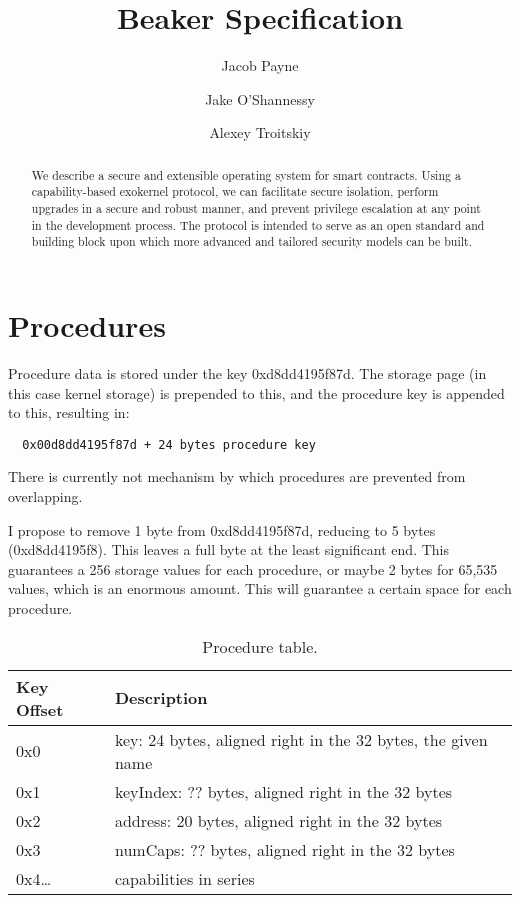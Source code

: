 \documentclass[english,a4paper]{article}
\title{Beaker Specification}\label{beaker-specification}
\author{Jacob Payne \and Jake O'Shannessy \and Alexey Troitskiy}
\begin{document}
\maketitle

\begin{abstract}\label{abstract}

We describe a secure and extensible operating system for smart contracts. Using
a capability-based exokernel protocol, we can facilitate secure isolation,
perform upgrades in a secure and robust manner, and prevent privilege escalation
at any point in the development process. The protocol is intended to serve as an
open standard and building block upon which more advanced and tailored security
models can be built.

\end{abstract}

\newpage
\tableofcontents
\newpage

\section{Procedures}\label{procedures}
Procedure data is stored under the key 0xd8dd4195f87d. The storage page (in this
case kernel storage) is prepended to this, and the procedure key is appended to
this, resulting in:

\begin{verbatim}
  0x00d8dd4195f87d + 24 bytes procedure key
\end{verbatim}

There is currently not mechanism by which procedures are prevented from
overlapping.

I propose to remove 1 byte from 0xd8dd4195f87d, reducing to 5 bytes
(0xd8dd4195f8). This leaves a full byte at the least significant end. This
guarantees a 256 storage values for each procedure, or maybe 2 bytes for 65,535
values, which is an enormous amount. This will guarantee a certain space for
each procedure.

\begin{table}[H]
  \caption{Procedure table.}
  \centering{}%
  \begin{tabular}{l|p{}}
    \hline
    Key Offset & Description\tabularnewline
    \hline
    \hline
    0x0       & key: 24 bytes, aligned right in the 32 bytes, the given
      name \tabularnewline
    0x1       & keyIndex: ?? bytes, aligned right in the 32 bytes
      \tabularnewline
    0x2       & address: 20 bytes, aligned right in the 32 bytes \tabularnewline
    0x3       & numCaps: ?? bytes, aligned right in the 32 bytes \tabularnewline
    0x4\ldots & capabilities in series \tabularnewline
    \hline
  \end{tabular}
\end{table}
\end{document}
